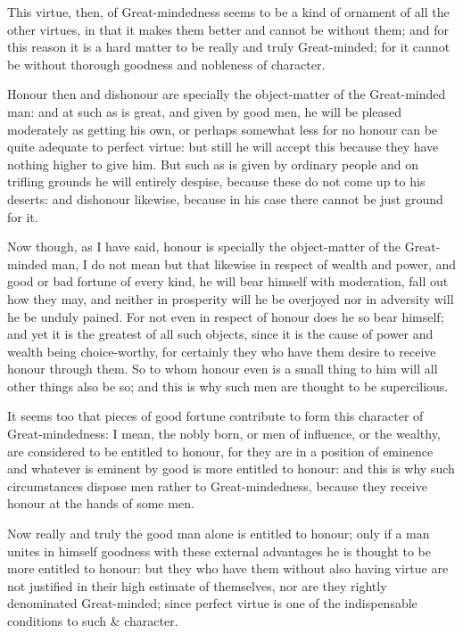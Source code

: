 This virtue, then, of Great-mindedness seems to be a kind of ornament of all
the other virtues, in that it makes them better and cannot be without them; and
for this reason it is a hard matter to be really and truly Great-minded; for it
cannot be without thorough goodness and nobleness of character.

Honour then and dishonour are specially the object-matter of the Great-minded
man: and at such as is great, and given by good men, he will be pleased
moderately as getting his own, or perhaps somewhat less for no honour can be
quite adequate to perfect virtue: but still he will accept this because they
have nothing higher to give him. But such as is given by ordinary people and on
trifling grounds he will entirely despise, because these do not come up to his
deserts: and dishonour likewise, because in his case there cannot be just
ground for it.

Now though, as I have said, honour is specially the object-matter of the
Great-minded man, I do not mean but that likewise in respect of wealth and
power, and good or bad fortune of every kind, he will bear himself with
moderation, fall out how they may, and neither in prosperity will he be
overjoyed nor in adversity will he be unduly pained. For not even in respect of
honour does he so bear himself; and yet it is the greatest of all such objects,
since it is the cause of power and wealth being choice-worthy, for certainly
they who have them desire to receive honour through them. So to whom honour
even is a small thing to him will all other things also be so; and this is why
such men are thought to be supercilious.

It seems too that pieces of good fortune contribute to form this character of
Great-mindedness: I mean, the nobly born, or men of influence, or the wealthy,
are considered to be entitled to honour, for they are in a position of eminence
and whatever is eminent by good is more entitled to honour: and this is why
such circumstances dispose men rather to Great-mindedness, because they receive
honour at the hands of some men.

Now really and truly the good man alone is entitled to honour; only if a man
unites in himself goodness with these external advantages he is thought to be
more entitled to honour: but they who have them without also having virtue are
not justified in their high estimate of themselves, nor are they rightly
denominated Great-minded; since perfect virtue is one of the indispensable
conditions to such \& character.

